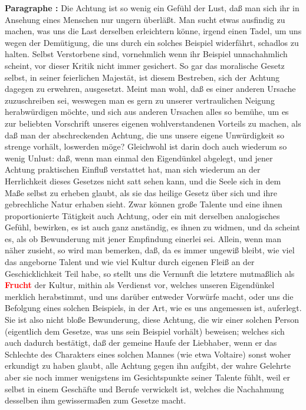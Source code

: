 \documentclass[a4paper,12pt,twoside]{book}
\newcommand{\match}[1]{\textcolor{red}{\textbf{#1}}}
\begin{document}
	\noindent\textbf{Paragraphe : }Die Achtung ist so wenig ein Gefühl der Lust, daß man sich ihr in Ansehung eines Menschen nur ungern überläßt. Man sucht etwas ausfindig zu machen, was uns die Last derselben erleichtern könne, irgend einen Tadel, um uns wegen der Demütigung, die uns durch ein solches Beispiel widerfährt, schadlos zu halten. Selbst Verstorbene sind, vornehmlich wenn ihr Beispiel unnachahmlich scheint, vor dieser Kritik nicht immer gesichert. So gar das moralische Gesetz selbst, in seiner feierlichen Majestät, ist diesem Bestreben, sich der Achtung dagegen zu erwehren, ausgesetzt. Meint man wohl, daß es einer anderen Ursache zuzuschreiben sei, weswegen man es gern zu unserer vertraulichen Neigung herabwürdigen möchte, und sich aus anderen Ursachen alles so bemühe, um es zur beliebten Vorschrift unseres eigenen wohlverstandenen Vorteils zu machen, als daß man der abschreckenden Achtung, die uns unsere eigene Unwürdigkeit so strenge vorhält, loswerden möge? Gleichwohl ist darin doch auch wiederum so wenig Unlust: daß, wenn man einmal den Eigendünkel abgelegt, und jener Achtung praktischen Einfluß verstattet hat, man sich wiederum an der Herrlichkeit dieses Gesetzes nicht satt  sehen kann, und die Seele sich in dem Maße selbst zu erheben glaubt, als sie das heilige Gesetz über sich und ihre gebrechliche Natur erhaben sieht. Zwar können große Talente und eine ihnen proportionierte Tätigkeit auch Achtung, oder ein mit derselben analogisches Gefühl, bewirken, es ist auch ganz anständig, es ihnen zu widmen, und da scheint es, als ob Bewunderung mit jener Empfindung einerlei sei. Allein, wenn man näher zusieht, so wird man bemerken, daß, da es immer ungewiß bleibt, wie viel das angeborne Talent und wie viel Kultur durch eigenen Fleiß an der Geschicklichkeit Teil habe, so stellt uns die Vernunft die letztere mutmaßlich als \match{Frucht} der Kultur, mithin als Verdienst vor, welches unseren Eigendünkel merklich herabstimmt, und uns darüber entweder Vorwürfe macht, oder uns die Befolgung eines solchen Beispiels, in der Art, wie es uns angemessen ist, auferlegt. Sie ist also nicht bloße Bewunderung, diese Achtung, die wir einer solchen Person (eigentlich dem Gesetze, was uns sein Beispiel vorhält) beweisen; welches sich auch dadurch bestätigt, daß der gemeine Haufe der Liebhaber, wenn er das Schlechte des Charakters eines solchen Mannes (wie etwa Voltaire) sonst woher erkundigt zu haben glaubt, alle Achtung gegen ihn aufgibt, der wahre Gelehrte aber sie noch immer wenigstens im Gesichtspunkte seiner Talente fühlt, weil er selbst in einem Geschäfte und Berufe verwickelt ist, welches die Nachahmung desselben ihm gewissermaßen zum Gesetze macht. 
	
\end{document}
